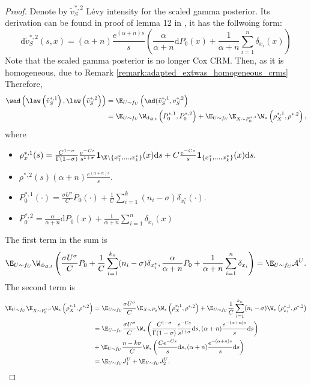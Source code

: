 \begin{proof}
    Denote by $\tilde{v}^{*,2}_{S}$ L\'evy intensity for the scaled gamma posterior. Its derivation can be found in proof of lemma 12 in \cite{catalano2023merging}, it has the follwoing form:
    \[
    \mathrm{d}\tilde{v}^{*,2}_{S}(s,x) = (\alpha + n)\frac{e^{(\alpha + n)s}}{s}\left( \frac{\alpha}{\alpha + n} \mathrm{d}P_0(x) + \frac{1}{\alpha + n}\sum_{i = 1}^n \delta_{x_i}(x) \right)
    \]
    Note that the scaled gamma posterior is no longer Cox CRM. Then, as it is homogeneous, due to Remark \ref{remark:adapted_extwas_homogeneous_crms}
    Therefore,
    \begin{align*}
    \wad\left( \law\left(\tilde{v}^{*,1}_{S}\right),  \law\left(\tilde{v}^{*,2}_{S}\right) \right) &= \E_{U \sim f_U}\left(\ad(\tilde{v}^{*,1}_{S}, v^{*,2}_S \right) \\
    &= \E_{U \sim f_U}  \W_{\mathrm{d}_{\X,t}} \left(P_0^{*,1}, P_0^{*,2} \right) + \E_{U \sim f_U}  \E_{X \sim P_0^{*,1}}\W_*\left(\rho_X^{*,1} , \rho^{*,2}\right),
    \end{align*}
    where 
    \begin{itemize}
        \item $\rho_x^{*,1}(s) = \frac{C^{1-\sigma}}{\Gamma(1-\sigma)}\frac{e^{-Cs}}{s^{1+\sigma}}\mathbf{1}_{\X \backslash\{x_1^*,\dots, x_k^*\}}(x)\mathrm{d}s + C\frac{e^{-Cs}}{s}\mathbf{1}_{\{x_1^*,\dots, x_k^*\}}(x)\mathrm{d}s.$
        \item $\rho^{*,2}(s)(\alpha + n)\frac{e^{(\alpha + n)s}}{s}$.
        \item $P_0^{*,1}(\cdot) = \frac{\sigma U^\sigma}{C} P_0(\cdot) + \frac{1}{C}\sum_{i = 1}^k (n_i - \sigma) \delta_{x_i^*}(\cdot).$
        \item $P_0^{*,2}=\frac{\alpha}{\alpha + n} \mathrm{d}P_0(x) + \frac{1}{\alpha + n}\sum_{i = 1}^n \delta_{x_i}(x)$
    \end{itemize}
    The first term in the sum is 
    \[
    \E_{U \sim f_U}  \W_{\mathrm{d}_{\X,t}} \left(\frac{ \sigma U^\sigma}{C}P_0 + \frac{1}{C}\sum_{i = 1}^{k_n}(n_i - \sigma) \delta_{x_i^*},
                         \frac{\alpha}{\alpha + n}P_0 + \frac{1}{\alpha + n}\sum_{i = 1}^n\delta_{x_i}\right) = \E_{U \sim f_U} \mathcal{A}^U.
    \]
    The second term is 
    \begin{align*}
        \E_{U \sim f_U}  \E_{X \sim P_0^{*,1}}\W_*\left(\rho_X^{*,1} , \rho^{*,2}\right) & = \E_{U \sim f_U} \frac{ \sigma U^\sigma}{C}\E_{X \sim P_0}\W_*\left(\rho_X^{*,1} , \rho^{*,2} \right) 
        + \E_{U \sim f_U}\frac{1}{C}\sum_{i = 1}^{k_n} (n_i - \sigma)\W_*\left(\rho_{x_i}^{*,1} , \rho^{*,2} \right) \\
        & =  \E_{U \sim f_U} \frac{ \sigma U^\sigma}{C}\W_*\left(\frac{C^{1-\sigma}}{\Gamma(1-\sigma)}\frac{e^{-Cs}}{s^{1+\sigma}}\mathrm{d}s,
                (\alpha + n)\frac{e^{-(\alpha + n)s}}{s}\mathrm{d}s\right) \\
        & +  \E_{U \sim f_U} \frac{n-k\sigma}{C}\W_*\left( \frac{Ce^{-Cs}}{s}\mathrm{d}s, (\alpha + n)\frac{e^{-(\alpha + n)s}}{s}\mathrm{d}s\right) \\
        & = \E_{U \sim f_U} J_1^U + \E_{U \sim f_U} J_2^U.
    \end{align*}
\end{proof}

